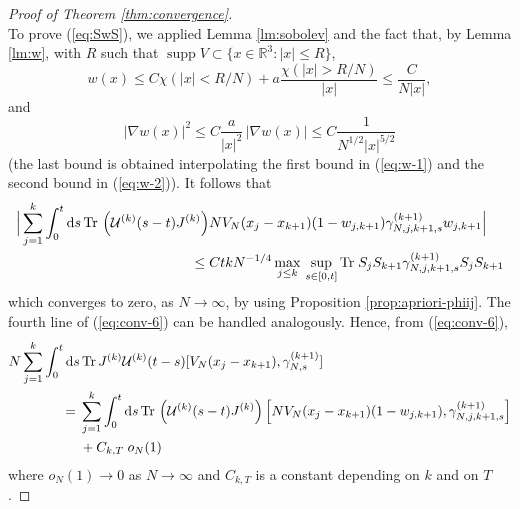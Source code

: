 \documentclass[11pt]{article}
\newcommand{\rd}{{\rm d}}
\newcommand{\cU}{{\cal U}}
\newcommand{\bR}{{\mathbb R}}
\newcommand{\tr}{\mbox{Tr}}
\newcommand{\supp}{\operatorname{supp}}
\begin{document}
\begin{proof}[Proof of Theorem \ref{thm:convergence}]
\begin{equation}
\end{equation}
 To prove (\ref{eq:SwS}), we applied Lemma \ref{lm:sobolev} and
the fact that, by Lemma \ref{lm:w}, with $R$ such that $\supp V
\subset \{ x \in \bR^3 : |x| \leq R\}$,
\[ w(x) \leq C \chi (|x| <R/N) + a \frac{\chi (|x|> R/N)}{|x|} \leq
\frac{C}{N|x|},\] and \[ |\nabla w(x)|^2 \leq C \frac{a}{|x|^2} \,
|\nabla w(x)| \leq C \frac{1}{N^{1/2} |x|^{5/2}} \] (the last bound
is obtained interpolating the first bound in (\ref{eq:w-1}) and the
second bound in (\ref{eq:w-2})). It follows that
\begin{equation}
\begin{split}
\Big| \sum_{j=1}^k \int_0^t \rd s \, \tr \, \left(\cU^{(k)} (s-t)
J^{(k)}\right) &N V_N (x_j -x_{k+1}) (1-w_{j,k+1})
\gamma_{N,j,k+1,s}^{(k+1)} w_{j,k+1} \Big|\\ \leq \; & C t k
N^{-1/4} \max_{j\leq k} \, \sup_{s \in [0,t]} \tr\; S_j S_{k+1}
\gamma_{N,j,k+1,s}^{(k+1)} S_j S_{k+1}
\end{split}
\end{equation}
which converges to zero, as $N \to \infty$, by using Proposition
\ref{prop:apriori-phiij}. The fourth line of (\ref{eq:conv-6}) can be
handled analogously. Hence, from (\ref{eq:conv-6}),
\begin{equation}\label{eq:conv-6b}
\begin{split}
N \sum_{j=1}^k \int_0^t \rd s &\, \tr \, J^{(k)} \cU^{(k)} (t-s) [
V_N (x_j -x_{k+1}) , \gamma_{N,s}^{(k+1)} ]
\\ = \; &\sum_{j=1}^k \int_0^t \rd s \, \tr \, \left(\cU^{(k)} (s-t)
J^{(k)}\right) \left[ N V_N (x_j -x_{k+1}) (1-w_{j,k+1}),
\gamma_{N,j,k+1,s}^{(k+1)} \right] \\ &+ C_{k,T} \; o_N(1)
\end{split}
\end{equation}
where $o_N (1) \to 0$ as $N\to \infty$ and $C_{k,T}$ is a constant
depending on $k$ and on $T$.



\end{proof}
\end{document}
